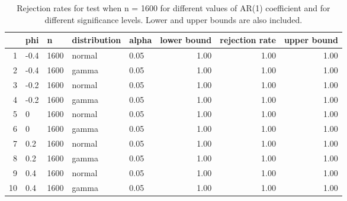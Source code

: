 \begin{table}[ht]
\centering
\caption{Rejection rates for test when n = 1600 for 
                   different values of AR(1) coefficient and for different 
                   significance levels. Lower and upper bounds are also 
                   included.} 
\label{table:rr_1600}
\begin{tabular}{rllllrrr}
  \hline
 & phi & n & distribution & alpha & lower bound & rejection rate & upper bound \\ 
  \hline
1 & -0.4 & 1600 & normal & 0.05 & 1.00 & 1.00 & 1.00 \\ 
  2 & -0.4 & 1600 & gamma & 0.05 & 1.00 & 1.00 & 1.00 \\ 
  3 & -0.2 & 1600 & normal & 0.05 & 1.00 & 1.00 & 1.00 \\ 
  4 & -0.2 & 1600 & gamma & 0.05 & 1.00 & 1.00 & 1.00 \\ 
  5 & 0 & 1600 & normal & 0.05 & 1.00 & 1.00 & 1.00 \\ 
  6 & 0 & 1600 & gamma & 0.05 & 1.00 & 1.00 & 1.00 \\ 
  7 & 0.2 & 1600 & normal & 0.05 & 1.00 & 1.00 & 1.00 \\ 
  8 & 0.2 & 1600 & gamma & 0.05 & 1.00 & 1.00 & 1.00 \\ 
  9 & 0.4 & 1600 & normal & 0.05 & 1.00 & 1.00 & 1.00 \\ 
  10 & 0.4 & 1600 & gamma & 0.05 & 1.00 & 1.00 & 1.00 \\ 
   \hline
\end{tabular}
\end{table}

